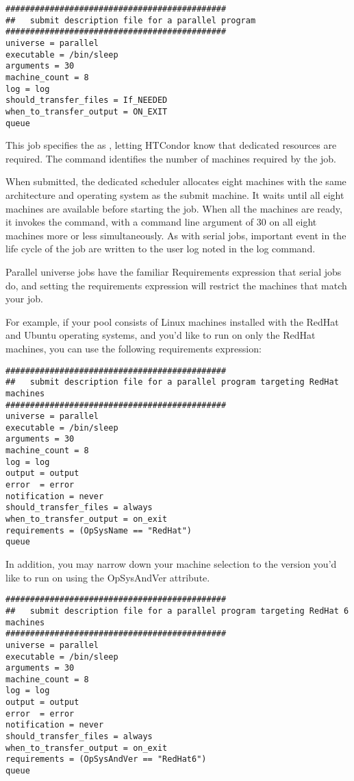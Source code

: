 \begin{verbatim}
#############################################
##   submit description file for a parallel program
#############################################
universe = parallel
executable = /bin/sleep
arguments = 30
machine_count = 8
log = log
should_transfer_files = If_NEEDED
when_to_transfer_output = ON_EXIT
queue 
\end{verbatim}

This job specifies the  as , letting
HTCondor know that dedicated resources are required.  The
 command identifies the number of machines
required by the job. 

When submitted, the dedicated scheduler allocates eight
machines with the same architecture and operating system as the submit
machine.  It waits until all eight machines are available before
starting the job.  When all the machines are ready, it invokes the
 command, with a command line argument of 30
on all eight machines more or less simultaneously.  As with serial
jobs, important event in the life cycle of the job are written
to the user log noted in the log command.

Parallel universe jobs have the familiar Requirements expression
that serial jobs do, and setting the requirements expression will
restrict the machines that match your job.

For example, if your pool consists of Linux machines installed with the RedHat and Ubuntu operating systems, and you'd like to run on only the RedHat machines, you can use
the following requirements expression:

\begin{verbatim}
#############################################
##   submit description file for a parallel program targeting RedHat machines
#############################################
universe = parallel
executable = /bin/sleep
arguments = 30
machine_count = 8
log = log
output = output
error  = error
notification = never
should_transfer_files = always
when_to_transfer_output = on_exit
requirements = (OpSysName == "RedHat")
queue 

\end{verbatim}

In addition, you may narrow down your machine selection to the version you'd like to run on using the OpSysAndVer attribute.

\begin{verbatim}
#############################################
##   submit description file for a parallel program targeting RedHat 6 machines
#############################################
universe = parallel
executable = /bin/sleep
arguments = 30
machine_count = 8
log = log
output = output
error  = error
notification = never
should_transfer_files = always
when_to_transfer_output = on_exit
requirements = (OpSysAndVer == "RedHat6")
queue
\end{verbatim}

